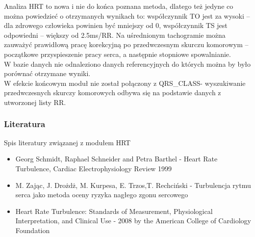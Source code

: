 Analiza HRT to nowa i nie do końca poznana metoda, dlatego też jedyne co można powiedzieć o otrzymanych wynikach to: współczynnik TO jest za wysoki – dla zdrowego człowieka powinien być mniejszy od 0, współczynnik TS jest odpowiedni – większy od 2.5ms/RR. Na uśrednionym tachogramie można zauważyć prawidłową pracę korekcyjną po przedwczesnym skurczu komorowym – początkowe przyspieszenie pracy serca, a następnie stopniowe spowalnianie.\\
W bazie danych nie odnaleziono danych referencyjnych do których można by było porównać otrzymane wyniki.\\
W efekcie końcowym moduł nie został połączony z QRS\_CLASS- wyszukiwanie przedwczesnych skurczy komorowych odbywa się na podstawie danych z utworzonej listy RR.


\subsubsection{Literatura}
Spis literatury związanej z modułem HRT
\begin{itemize}
\item Georg Schmidt, Raphael Schneider and Petra Barthel - Heart Rate Turbulence, Cardiac Electrophysiology Review 1999 
\item M. Zając, J. Drożdż, M. Kurpesa, E. Trzos,T. Rechciński - Turbulencja rytmu serca jako metoda oceny ryzyka nagłego zgonu sercowego
\item Heart Rate Turbulence: Standards of Measurement, Physiological Interpretation, and Clinical Use - 2008 by the American College of Cardiology Foundation
\end{itemize}
